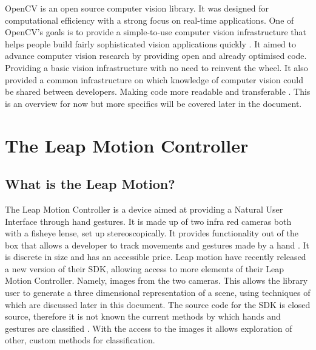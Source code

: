 \documentclass[11pt,oneside]{report}
\begin{document}
				OpenCV is an open source computer vision library.
				It was designed for computational efficiency with a strong focus on real-time applications.
				One of OpenCV's goals is to provide a simple-to-use computer vision infrastructure that helps people build fairly sophisticated vision applications quickly \cite[p. 1]{definition:cv}.	
				It aimed to advance computer vision research by providing open and already optimised code.
				Providing a basic vision infrastructure with no need to reinvent the wheel.
				It also provided a common infrastructure on which knowledge of computer vision could be shared between developers.
				Making code more readable and transferable \cite[p. 6]{definition:cv}. 
				This is an overview for now but more specifics will be covered later in the document.
				
		\section{The Leap Motion Controller}
			\subsection{What is the Leap Motion?}
				The Leap Motion Controller is a device aimed at providing a Natural User Interface through hand gestures.
				It is made up of two infra red cameras both with a fisheye lense, set up stereoscopically. %
				It provides functionality out of the box that allows a developer to track movements and gestures made by a hand \cite{web:leapGestures}.
				It is discrete in size and has an accessible price. %
				Leap motion have recently released a new version of their SDK, allowing access to more elements of their Leap Motion Controller. 
				Namely, images from the two cameras. 
				This allows the library user to generate a three dimensional representation of a scene, using techniques of which are discussed later in this document. %
				The source code for the SDK is closed source, therefore it is not known the current methods by which hands and gestures are classified \cite[p. 217]{journal:leapEvaluation}.
				With the access to the images it allows exploration of other, custom methods for classification.
\end{document}
